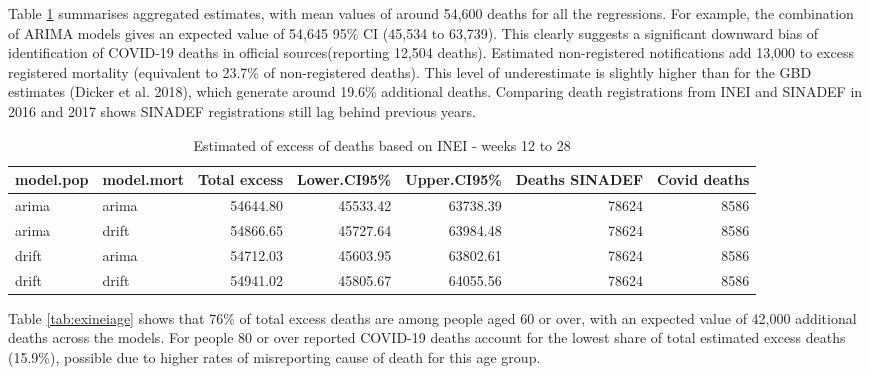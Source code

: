 \documentclass[
]{article}
\begin{document}
Table \ref{tab:exinei} summarises aggregated estimates, with mean values of around 54,600 deaths for all the regressions. For example, the combination of \(\text{ARIMA}\) models gives an expected value of 54,645 95\% CI (45,534 to 63,739). This clearly suggests a significant downward bias of identification of COVID-19 deaths in official sources(reporting 12,504 deaths). Estimated non-registered notifications add 13,000 to excess registered mortality (equivalent to 23.7\% of non-registered deaths). This level of underestimate is slightly higher than for the GBD estimates (Dicker et al. 2018), which generate around 19.6\% additional deaths. Comparing death registrations from INEI and SINADEF in 2016 and 2017 shows SINADEF registrations still lag behind previous years.

\begin{table}[!h]

\caption{\label{tab:exinei}Estimated of excess of deaths based on INEI - weeks 12 to 28}
\centering
\begin{tabular}[t]{llrrrrr}
\toprule
model.pop & model.mort & Total excess & Lower.CI95\% & Upper.CI95\% & Deaths SINADEF & Covid deaths\\
\midrule
arima & arima & 54644.80 & 45533.42 & 63738.39 & 78624 & 8586\\
arima & drift & 54866.65 & 45727.64 & 63984.48 & 78624 & 8586\\
drift & arima & 54712.03 & 45603.95 & 63802.61 & 78624 & 8586\\
drift & drift & 54941.02 & 45805.67 & 64055.56 & 78624 & 8586\\
\bottomrule
\end{tabular}
\end{table}

Table \ref{tab:exineiage} shows that 76\% of total excess deaths are among people aged 60 or over, with an expected value of 42,000 additional deaths across the models. For people 80 or over reported COVID-19 deaths account for the lowest share of total estimated excess deaths (15.9\%), possible due to higher rates of misreporting cause of death for this age group.
\end{document}
